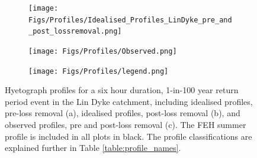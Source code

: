 \documentclass[APA,Times2COL]{WileyNJDv5}
\begin{document}



\begin{figure}[!t] 
\begin{subfigure}[H]{\linewidth}
\texttt{[image: Figs/Profiles/Idealised\_Profiles\_LinDyke\_pre\_and\_post\_lossremoval.png]}
\end{subfigure}
\begin{subfigure}{\linewidth}
  \centering
  \texttt{[image: Figs/Profiles/Observed.png]}
\end{subfigure}
\begin{subfigure}[H]{\linewidth}
\flushright
\texttt{[image: Figs/Profiles/legend.png]}
\end{subfigure}
\hfill
\hfill
\caption{Hyetograph profiles for a six hour duration, 1-in-100 year return period event in the Lin Dyke catchment, including idealised profiles, pre-loss removal (a), idealised profiles, post-loss removal (b), and observed profiles, pre and post-loss removal (c). The FEH summer profile is included in all plots in black. The profile classifications are explained further in Table \ref{table:profile_names}.} \label{fig:profiles} 
\end{figure}
\end{document}
